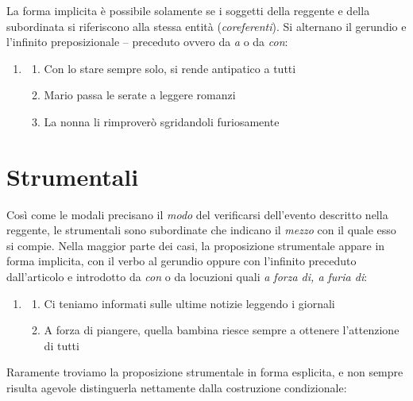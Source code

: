 \documentclass[
  a4paper,
  twoside,
  11pt,
  chapterprefix=false,
  bibliography=totocnumbered,
  listof=flat]{scrbook}
\providecommand{\tightlist}{%
  \setlength{\itemsep}{0pt}\setlength{\parskip}{0pt}}
\begin{document}
La forma implicita è possibile solamente se i soggetti della reggente e della subordinata si riferiscono alla stessa entità (\emph{coreferenti}). Si alternano il gerundio e l'infinito preposizionale -- preceduto ovvero da \emph{a} o da \emph{con}:

\begin{enumerate}
\def\labelenumi{(\arabic{enumi})}
\setcounter{enumi}{105}
\item
  \begin{enumerate}
  \def\labelenumii{\alph{enumii}.}
  \tightlist
  \item
    Con lo stare sempre solo, si rende antipatico a tutti
  \item
    Mario passa le serate a leggere romanzi
  \item
    La nonna li rimproverò sgridandoli furiosamente
  \end{enumerate}
\end{enumerate}

\hypertarget{strumentali}{%
\section{Strumentali}\label{strumentali}}

Così come le modali precisano il \emph{modo} del verificarsi dell'evento descritto nella reggente, le strumentali sono subordinate che indicano il \emph{mezzo} con il quale esso si compie.
Nella maggior parte dei casi, la proposizione strumentale appare in forma implicita, con il verbo al gerundio oppure con l'infinito preceduto dall'articolo e introdotto da \emph{con} o da locuzioni quali \emph{a forza di, a furia di}:

\begin{enumerate}
\def\labelenumi{(\arabic{enumi})}
\setcounter{enumi}{106}
\item
  \begin{enumerate}
  \def\labelenumii{\alph{enumii}.}
  \tightlist
  \item
    Ci teniamo informati sulle ultime notizie leggendo i giornali
  \item
    A forza di piangere, quella bambina riesce sempre a ottenere l'attenzione di tutti
  \end{enumerate}
\end{enumerate}

Raramente troviamo la proposizione strumentale in forma esplicita, e non sempre risulta agevole distinguerla nettamente dalla costruzione condizionale:
\end{document}
